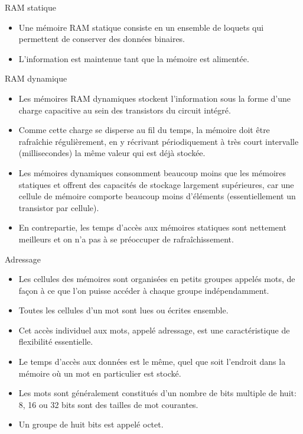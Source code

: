 \documentclass[presentation]{beamer}
\begin{document}
\begin{frame}[label={sec:orgc550980}]{RAM statique}
\begin{itemize}
\item Une mémoire RAM \alert{statique} consiste en un ensemble de loquets qui permettent de conserver des données binaires.

\item L'information est maintenue tant que la mémoire est alimentée.
\end{itemize}
\end{frame}

\begin{frame}[label={sec:org533ae42}]{RAM dynamique}
\begin{itemize}
\item Les mémoires RAM \alert{dynamiques} stockent l'information sous la forme d'une charge capacitive au sein des transistors du circuit intégré.

\item Comme cette charge se disperse au fil du temps, la mémoire doit être rafraîchie régulièrement, en y récrivant périodiquement à très court intervalle (millisecondes) la même valeur qui est déjà stockée.

\item Les mémoires dynamiques consomment beaucoup moins que les mémoires statiques et offrent des capacités de stockage largement supérieures, car une cellule de mémoire comporte beaucoup moins d'éléments (essentiellement un transistor par cellule).

\item En contrepartie, les temps d'accès aux mémoires statiques sont nettement meilleurs et on n'a pas à se préoccuper de rafraîchissement.
\end{itemize}
\end{frame}

\begin{frame}[label={sec:org58a99a8}]{Adressage}
\begin{itemize}
\item Les cellules des mémoires sont organisées en petits groupes appelés \alert{mots}, de façon à ce que l'on puisse accéder à chaque groupe indépendamment.

\item Toutes les cellules d'un mot sont lues ou écrites ensemble.

\item Cet accès individuel aux mots, appelé \alert{adressage}, est une caractéristique de flexibilité essentielle.

\item Le temps d'accès aux données est le même, quel que soit l'endroit dans la mémoire où un mot en particulier est stocké.

\item Les mots sont généralement constitués d'un nombre de bits multiple de huit: 8, 16 ou 32 bits sont des tailles de mot courantes.

\item Un groupe de huit bits est appelé \alert{octet}.
\end{itemize}
\end{frame}
\end{document}
